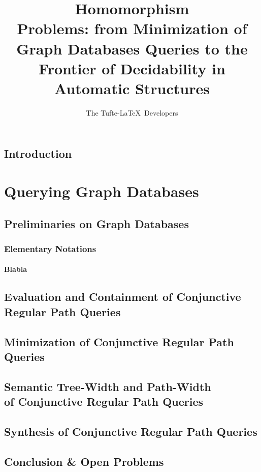 \documentclass[a4paper,sfsidenotes,twoside,justified]{tufte-book-custom}
\title[On Homomorphism Problems]{ Homomorphism\\ Problems: from Minimization of Graph Databases Queries to the Frontier of Decidability in Automatic Structures}
\author[The Tufte-LaTeX Developers]{The Tufte-LaTeX\ Developers}
\begin{document}
\frontmatter





\mainmatter
\chapter{Introduction}

\part{Querying Graph Databases}

\chapter{Preliminaries on Graph Databases}

\section{Elementary Notations}

\subsection{Blabla}

\lipsum[1-40]

\chapter{Evaluation and Containment of Conjunctive Regular Path Queries}

\chapter{Minimization of Conjunctive Regular Path Queries}

\chapter[{Semantic Tree-Width and Path-Width of Conjunctive Regular Path Queries}]{Semantic Tree-Width and Path-Width\\of Conjunctive Regular Path Queries}

\chapter{Synthesis of Conjunctive Regular Path Queries}

\chapter{Conclusion \& Open Problems}
\end{document}
